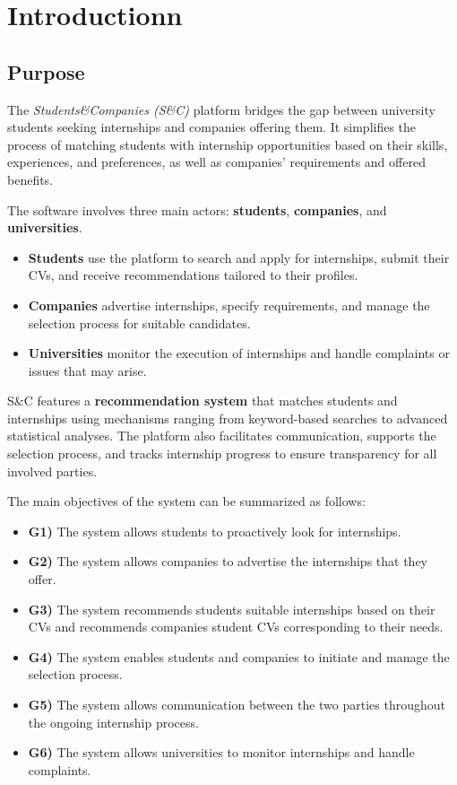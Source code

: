 \chapter{Introductionn}

\section{Purpose}

The \textit{Students\&Companies (S\&C)} platform bridges the gap between university students seeking internships and companies offering them. It simplifies the process of matching students with internship opportunities based on their skills, experiences, and preferences, as well as companies' requirements and offered benefits.

The software involves three main actors: \textbf{students}, \textbf{companies}, and \textbf{universities}.

\begin{itemize}
    \item \textbf{Students} use the platform to search and apply for internships, submit their CVs, and receive recommendations tailored to their profiles.
    \item \textbf{Companies} advertise internships, specify requirements, and manage the selection process for suitable candidates.
    \item \textbf{Universities} monitor the execution of internships and handle complaints or issues that may arise.
\end{itemize}

S\&C features a \textbf{recommendation system} that matches students and internships using mechanisms ranging from keyword-based searches to advanced statistical analyses. The platform also facilitates communication, supports the selection process, and tracks internship progress to ensure transparency for all involved parties.

The main objectives of the system can be summarized as follows:

\begin{itemize}
    \item \textbf{G1)} The system allows students to proactively look for internships.
    \item \textbf{G2)} The system allows companies to advertise the internships that they offer.
    \item \textbf{G3)} The system recommends students suitable internships based on their CVs and recommends companies student CVs corresponding to their needs.
    \item \textbf{G4)} The system enables students and companies to initiate and manage the selection process.
    \item \textbf{G5)} The system allows communication between the two parties throughout the ongoing internship process.
    \item \textbf{G6)} The system allows universities to monitor internships and handle complaints.
\end{itemize}

